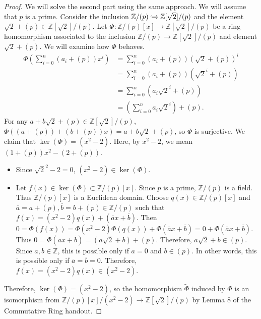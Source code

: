 \documentclass[12pt, psamsfonts]{amsart}
\theoremstyle{definition}
\theoremstyle{remark}
\numberwithin{equation}{section}
\begin{document}
\begin{proof}
  We will solve the second part using the same approach.
  We will assume that $p$ is a prime.
  Consider the inclusion $\mathbb{Z}/(p) \xhookrightarrow{} \mathbb{Z}[\sqrt{2}]/(p)$ and the element $\sqrt{2} + (p) \in \mathbb{Z}[\sqrt{2}]/(p)$.
  Let $\Phi: \mathbb{Z}/(p)[x] \rightarrow \mathbb{Z}[\sqrt{2}]/(p)$ be a ring homomorphism associated to the inclusion $\mathbb{Z}/(p) \rightarrow \mathbb{Z}[\sqrt{2}]/(p)$ and element $\sqrt{2} + (p)$.
  We will examine how $\Phi$ behaves.
  \begin{align*}
    \Phi(\sum_{i=0}^{n}(a_i + (p))x^i)
      &= \sum_{i=0}^{n}(a_i + (p))(\sqrt{2} + (p))^i \\
      &= \sum_{i=0}^{n}(a_i + (p))(\sqrt{2}^i + (p)) \\
      &= \sum_{i=0}^{n}(a_i \sqrt{2}^i + (p)) \\
      &= (\sum_{i=0}^{n} a_i\sqrt{2}^i) + (p).
  \end{align*}
  For any $a + b\sqrt{2} + (p) \in \mathbb{Z}[\sqrt{2}]/(p)$, $\Phi((a + (p)) + (b + (p))x) = a + b\sqrt{2} + (p)$, so $\Phi$ is surjective.
  We claim that $\ker(\Phi) = (x^2 - 2)$.
  Here, by $x^2 - 2$, we mean $(1 + (p))x^2 - (2 + (p))$.
  \begin{itemize}
    \item
      Since $\sqrt{2}^2 - 2 = 0$, $(x^2 - 2) \in \ker(\Phi)$.
    \item
      Let $f(x) \in \ker(\Phi) \subset \mathbb{Z}/(p)[x]$.
      Since $p$ is a prime, $\mathbb{Z}/(p)$ is a field.
      Thus $\mathbb{Z}/(p)[x]$ is a Euclidean domain.
      Choose $q(x) \in \mathbb{Z}/(p)[x]$ and $\overline{a} = a + (p), \overline{b} = b + (p) \in \mathbb{Z}/(p)$ such that $f(x) = (x^2 - 2)q(x) + (\overline{a}x + \overline{b})$.
      Then $0 = \Phi(f(x)) = \Phi(x^2 - 2)\Phi(q(x)) + \Phi(\overline{a}x + \overline{b}) = 0 + \Phi(\overline{a}x + \overline{b})$.
      Thus $0 = \Phi(\overline{a}x + \overline{b}) = (a\sqrt{2} + b) + (p)$.
      Therefore, $a\sqrt{2} + b \in (p)$.
      Since $a, b \in \mathbb{Z}$, this is possible only if $a = 0$ and $b \in (p)$.
      In other words, this is possible only if $\overline{a} = \overline{b} = 0$.
      Therefore, $f(x) = (x^2 - 2)q(x) \in (x^2 - 2)$.
  \end{itemize}
  Therefore, $\ker(\Phi) = (x^2 - 2)$, so the homomorphism $\tilde{\Phi}$ induced by $\Phi$ is an isomorphism from $\mathbb{Z}/(p)[x]/(x^2 - 2) \rightarrow \mathbb{Z}[\sqrt{2}]/(p)$ by Lemma 8 of the Commutative Ring handout.
\end{proof}
\end{document}
